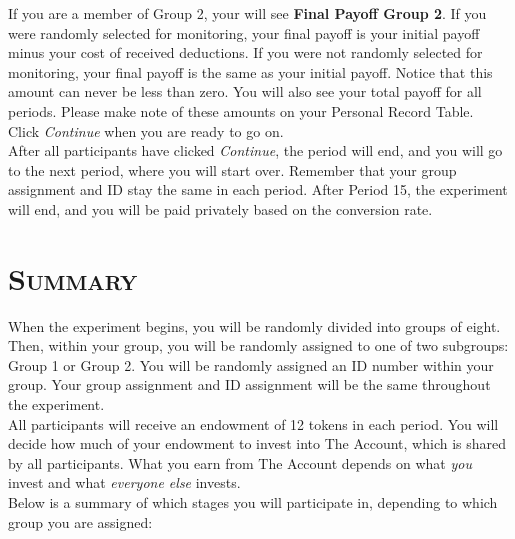 \documentclass[12pt]{article}
\begin{document}
If you are a member of Group 2, your will see {\bf Final Payoff Group 2}.  If you were randomly selected for monitoring, your final payoff is your initial payoff minus your cost of received deductions. If you were not randomly selected for monitoring, your final payoff is the same as your initial payoff. Notice that this amount can never be less than zero.  You will also see your total payoff for all periods.  Please make note of these amounts on your Personal Record Table.\\
  
Click {\em Continue} when you are ready to go on.\\
 
After all participants have clicked {\em Continue}, the period will end, and you will go to the next period, where you will start over. Remember that your group assignment and ID stay the same in each period.  After Period 15, the experiment will end, and you will be paid privately based on the conversion rate.\\



\newpage

\section*{\scshape Summary}

\iffalse
When the experiment begins, you will be randomly divided into groups of eight.  Then, within your group, you will be randomly assigned to one of two subgroups: Group 1 or Group 2.  You will be randomly assigned an ID number within your group.  Your group assignment and ID assignment will be the same throughout the experiment.\\

All participants will receive an endowment of 12 tokens in each period.  You will decide how much of your endowment to invest into The Account, which is shared by all participants. What you earn from The Account depends on what {\em you} invest and what {\em everyone else} invests.\\  

Below is a summary of which stages you will participate in, depending to which group you are assigned:
\end{document}
